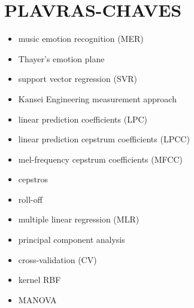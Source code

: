 \documentclass{article}
\begin{document}
\section{PLAVRAS-CHAVES}
\begin{itemize}
    \item music emotion recognition (MER)
    \item Thayer’s emotion plane
    \item support vector regression (SVR)
    \item Kansei Engineering measurement approach
    \item linear prediction coefficients (LPC)
    \item linear prediction cepstrum coefficients (LPCC)
    \item mel-frequency cepstrum coefficients (MFCC)
    \item cepstros
    \item roll-off
    \item multiple linear regression (MLR)
    \item principal component analysis
    \item cross-validation (CV)
    \item kernel RBF
    \item MANOVA
\end{itemize}
\end{document}

